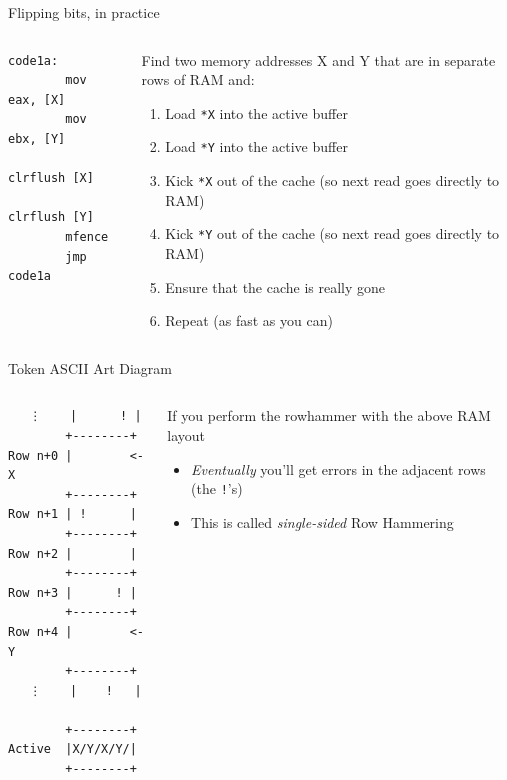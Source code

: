 \documentclass[9pt,aspectratio=169]{beamer}
\begin{document}
\begin{frame}[label={sec:org94af626},fragile]{Flipping bits, in practice}
 \begin{columns}
\begin{column}[t]{0.49\columnwidth}
\begin{verbatim}
code1a:
        mov eax, [X]
        mov ebx, [Y]
        clrflush [X]
        clrflush [Y]
        mfence
        jmp code1a
\end{verbatim}
\end{column}

\begin{column}[t]{0.49\columnwidth}
Find two memory addresses X and Y that are in separate rows of RAM and:
\begin{enumerate}
\item Load \texttt{*X} into the active buffer
\item Load \texttt{*Y} into the active buffer
\item Kick \texttt{*X} out of the cache (so next read goes directly to RAM)
\item Kick \texttt{*Y} out of the cache (so next read goes directly to RAM)
\item Ensure that the cache is really gone
\item Repeat (as fast as you can)
\end{enumerate}
\end{column}
\end{columns}
\end{frame}

\begin{frame}[label={sec:orga0581ee},fragile]{Token ASCII Art Diagram}
 \begin{columns}
\begin{column}[t]{0.2\columnwidth}
\begin{verbatim}
   ⋮    |      ! |
        +--------+
Row n+0 |        <- X
        +--------+
Row n+1 | !      |
        +--------+
Row n+2 |        | 
        +--------+
Row n+3 |      ! | 
        +--------+
Row n+4 |        <- Y
        +--------+
   ⋮    |    !   |

        +--------+
Active  |X/Y/X/Y/|
        +--------+
\end{verbatim}
\end{column}

\begin{column}[t]{0.79\columnwidth}
If you perform the rowhammer with the above RAM layout
\begin{itemize}
\item \emph{Eventually} you'll get errors in the adjacent rows (the \texttt{!}'s)
\item This is called \emph{single-sided} Row Hammering
\end{itemize}
\end{column}
\end{columns}
\end{frame}
\end{document}
